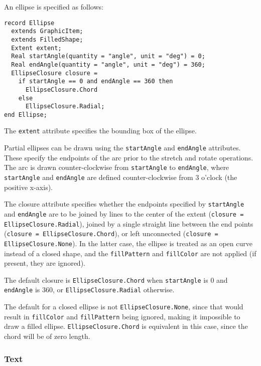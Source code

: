An ellipse is specified as follows:
\begin{lstlisting}[language=modelica]
record Ellipse
  extends GraphicItem;
  extends FilledShape;
  Extent extent;
  Real startAngle(quantity = "angle", unit = "deg") = 0;
  Real endAngle(quantity = "angle", unit = "deg") = 360;
  EllipseClosure closure =
    if startAngle == 0 and endAngle == 360 then
      EllipseClosure.Chord
    else
      EllipseClosure.Radial;
end Ellipse;
\end{lstlisting}%
The \lstinline!extent! attribute specifies the bounding box of the ellipse.

Partial ellipses can be drawn using the \lstinline!startAngle! and \lstinline!endAngle! attributes.  These specify the endpoints of the arc prior to the stretch and rotate operations.  The arc is drawn counter-clockwise from \lstinline!startAngle! to \lstinline!endAngle!, where \lstinline!startAngle! and \lstinline!endAngle! are defined counter-clockwise from 3 o'clock (the positive x-axis).

The closure attribute specifies whether the endpoints specified by \lstinline!startAngle! and \lstinline!endAngle! are to be joined by lines to the center of the extent (\lstinline!closure = EllipseClosure.Radial!), joined by a single straight line between the end points (\lstinline!closure = EllipseClosure.Chord!), or left unconnected (\lstinline!closure = EllipseClosure.None!).  In the latter case, the ellipse is treated as an open curve instead of a closed shape, and the \lstinline!fillPattern! and \lstinline!fillColor! are not applied (if present, they are ignored).

The default closure is \lstinline!EllipseClosure.Chord! when \lstinline!startAngle! is 0 and \lstinline!endAngle! is 360, or \lstinline!EllipseClosure.Radial! otherwise.

\begin{nonnormative}
The default for a closed ellipse is not \lstinline!EllipseClosure.None!, since that would result in \lstinline!fillColor!
and \lstinline!fillPattern! being ignored, making it impossible to draw a filled ellipse. \lstinline!EllipseClosure.Chord!
is equivalent in this case, since the chord will be of zero length.
\end{nonnormative}

\subsubsection{Text}\label{text}

